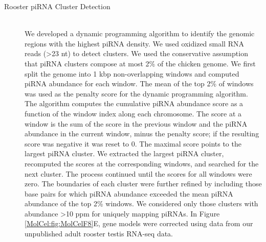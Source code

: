 \begin{description}
    \item[Rooster piRNA Cluster Detection] \hfill \\
    We developed a dynamic programming algorithm to identify the genomic regions with the highest piRNA density. We used oxidized small RNA reads (>23 nt) to detect clusters. We used the conservative assumption that piRNA clusters compose at most 2\% of the chicken genome. We first split the genome into 1 kbp non-overlapping windows and computed piRNA abundance for each window. The mean of the top 2\% of windows was used as the penalty score for the dynamic programming algorithm. The algorithm computes the cumulative piRNA abundance score as a function of the window index along each chromosome. The score at a window is the sum of the score in the previous window and the piRNA abundance in the current window, minus the penalty score; if the resulting score was negative it was reset to 0. The maximal score points to the largest piRNA cluster. We extracted the largest piRNA cluster, recomputed the scores at the corresponding windows, and searched for the next cluster. The process continued until the scores for all windows were zero. The boundaries of each cluster were further refined by including those base pairs for which piRNA abundance exceeded the mean piRNA abundance of the top 2\% windows. We considered only those clusters with abundance >10 ppm for uniquely mapping piRNAs. In Figure \ref{MolCel:fig:MolCelF8}E, gene models were corrected using data from our unpublished adult rooster testis RNA-seq data.

  	\end{description}

\cleardoublepage